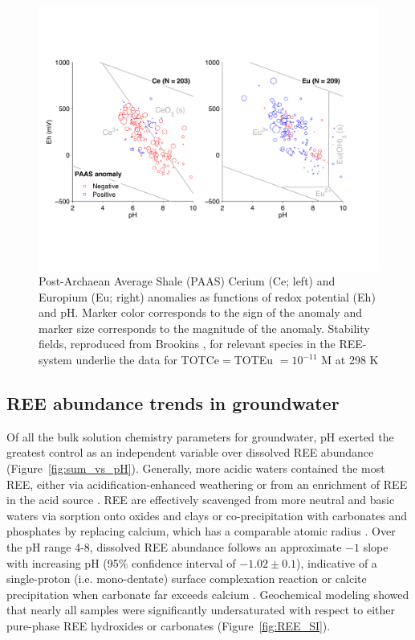 \begin{figure}[htbp]
\begin{center}
\includegraphics[width=\textwidth]{Ch3_figures/Ce-Eu-stability-anom.pdf}
\caption{Post-Archaean Average Shale (PAAS) Cerium (Ce; left) and Europium (Eu; right) anomalies as functions of redox potential (Eh) and pH.
Marker color corresponds to the sign of the anomaly and marker size corresponds to the magnitude of the anomaly.
Stability fields, reproduced from Brookins \citep{Brookins_RMG_1989}, for relevant species in the REE- system underlie the data for TOTCe$=$TOTEu $=10^{-11}$ M at 298 K}\label{fig:pourbaix}
\end{center}
\end{figure}

\subsection{REE abundance trends in groundwater}

Of all the bulk solution chemistry parameters for groundwater, pH exerted the greatest control as an independent variable over dissolved REE abundance (Figure~\ref{fig:sum_vs_pH}). Generally, more acidic waters contained the most REE, either via acidification-enhanced weathering or from an enrichment of REE in the acid source \citep{Dia_GCA_2000, Smedley_GCA_1991, Gosselin_GCA_1992, Janssen_WR_2003, Worrall_AG_2001, Leybourne_AG_2000, Miekeley_JGE_1992}.
REE are effectively scavenged from more neutral and basic waters via sorption onto oxides and clays or co-precipitation with carbonates and phosphates by replacing calcium, which has a comparable atomic radius \citep{Johannesson_LO_1994, CRC_handbook, Bradbury_GCA_2002, Coppin_CG_2002, Quinn_MC_2006, Terakado_CG_1988}.
Over the pH range 4-8, dissolved REE abundance follows an approximate $-1$ slope with increasing pH (95\% confidence interval of $-1.02 \pm 0.1$), indicative of a single-proton (i.e. mono-dentate) surface complexation reaction or calcite precipitation when carbonate far exceeds calcium \citep{Morel_Herring}.
Geochemical modeling showed that nearly all samples were significantly undersaturated with respect to either pure-phase REE hydroxides or carbonates (Figure~\ref{fig:REE_SI}).

